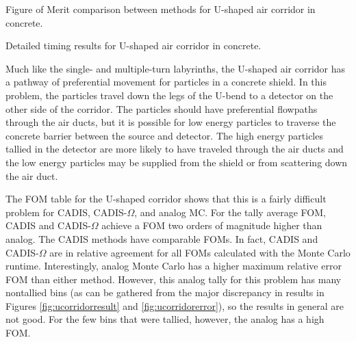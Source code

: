 \begin{table}[h!]
  \centering
  
  \caption[Figure of Merit comparison between methods for U-shaped air corridor in concrete.]
  {Figure of Merit comparison between methods for U-shaped air corridor in
  concrete.}
  \label{tab:ucorridorfoms}
\end{table}

\begin{table}[h!]
  \centering
  
  \caption[Detailed timing results for U-shaped air corridor in concrete.]
  {Detailed timing results for U-shaped air corridor in concrete.}
  \label{tab:ucorridortimes}
\end{table}

Much like the single- and multiple-turn labyrinths, the U-shaped air corridor
has a pathway of preferential movement for particles in a concrete shield. In
this problem, the particles travel down the legs of the U-bend to a detector on
the other side of the corridor. The particles should have preferential flowpaths
through the air ducts, but it is possible for low energy particles to traverse
the concrete barrier between the source and detector. The high energy particles
tallied in the detector are more likely to have traveled through the air ducts
and the low energy particles may be supplied from the shield or from scattering
down the air duct.

The FOM table for the U-shaped corridor shows that this is a fairly difficult
problem for CADIS, CADIS-$\Omega$, and analog MC. For the tally average FOM,
CADIS and CADIS-$\Omega$ achieve a FOM two orders of magnitude higher than 
analog. The CADIS methods have comparable FOMs. In fact, CADIS and
CADIS-$\Omega$ are in relative agreement for all FOMs calculated with the Monte
Carlo runtime. Interestingly, analog Monte Carlo has a higher
maximum relative error FOM than either method. However, this analog tally for
this problem has many
nontallied bins (as can be gathered from the major discrepancy in results in
Figures \ref{fig:ucorridorresult} and \ref{fig:ucorridorerror}), so the results in general are not good. For the
few bins that were tallied, however, the analog has a high FOM.


